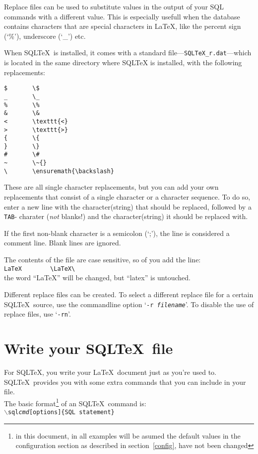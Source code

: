\documentclass{article}
\newcommand{\bs}{\ensuremath{\backslash}}
\begin{document}
Replace files can be used to substitute values in the output of your SQL commands with a different value. This is especially usefull when the database
contains characters that are special characters in \LaTeX, like the percent sign (`\%'), underscore (`\_') etc.

When SQL\TeX\ is installed, it comes with a standard file---\texttt{SQLTeX\_r.dat}---which is located in the same directory where SQLTeX is installed,
with the following replacements:

\vspace{3mm}

\noindent\begin{verbatim}
$       \$
_       \_
%       \%
&       \&
<       \texttt{<}
>       \texttt{>}
{       \{
}       \}
#       \#
~       \~{}
\       \ensuremath{\backslash}
\end{verbatim}

\vspace{3mm}

These are all single character replacements, but you can add your own replacements that consist of a single character or a character sequence. To do so,
enter a new line with the character(string) that should be replaced, followed by a \texttt{TAB}- charater (\textit{not} blanks!) and the character(string)
it should be replaced with.

If the first non-blank character is a semicolon (`;'), the line is considered a comment line. Blank lines are ignored.

\vspace{3mm}

The contents of the file are case sensitive, so of you add the line: \\
\verb+LaTeX        \LaTeX\+ \\
the word ``LaTeX'' will be changed, but ``latex'' is untouched.

\vspace{3mm}

Different replace files can be created. To select a different replace file for a certain SQL\TeX\ source, use the commandline option
`\texttt{-r \textit{filename}}'. To disable the use of replace files, use `\texttt{-rn}'.


\section{Write your SQL\TeX\ file}

For SQL\TeX, you write your \LaTeX\ document just as you're used to. SQL\TeX\ provides you with
some extra commands that you can include in your file.\\
The basic format\footnote{in this document, in all examples will be asumed the default values in the
configuration section as described in section~\ref{config}, have not been changed} of an SQL\TeX\ command is: \\
\texttt{\bs sql\emph{cmd}[options]\{SQL statement\}}
\end{document}
